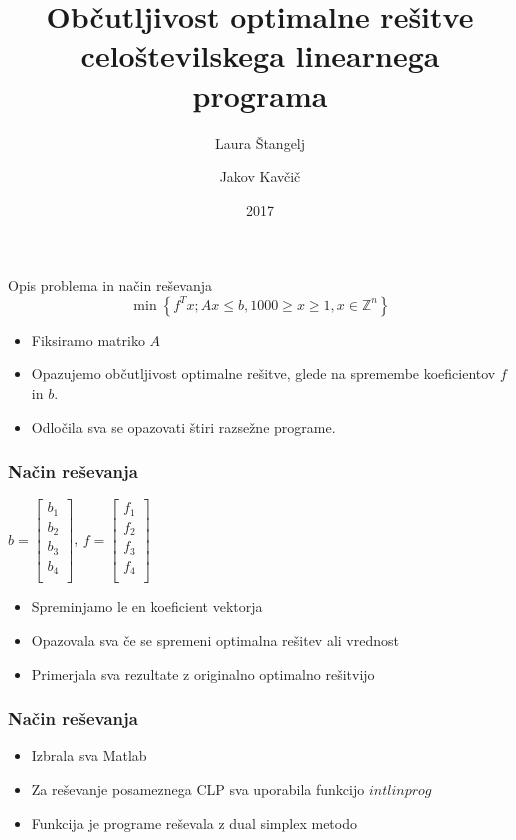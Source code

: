 \documentclass[t]{beamer}
\title{Občutljivost optimalne rešitve celoštevilskega linearnega programa}
\author
{Laura Štangelj \and Jakov Kavčič}
\date{2017}
\begin{document}
\begin{frame}
  \titlepage
\end{frame}

\begin{frame}{Opis problema in način reševanja}
$$\min\left\{f^Tx; Ax \leq b, 1000 \geq x \geq 1, x \in \mathbb{Z}^n \right\}$$
\begin{itemize}
\item Fiksiramo matriko $A$
\item Opazujemo občutljivost optimalne rešitve, glede na spremembe koeficientov $f$ in $b$.
\item Odločila sva se opazovati štiri razsežne programe.
\end{itemize}
\end{frame}

\begin{frame}
\frametitle{Način reševanja}
\begin{center}
$b = \begin{bmatrix}
b_1\\
b_2\\
b_3\\
b_4\\
\end{bmatrix}$, $f = \begin{bmatrix}
f_1\\
f_2\\
f_3\\
f_4\\
\end{bmatrix}$
\end{center}
\begin{itemize}
\item Spreminjamo le en koeficient vektorja
\item Opazovala sva če se spremeni optimalna rešitev ali vrednost
\item Primerjala sva rezultate z originalno optimalno rešitvijo
\end{itemize}
\end{frame}


\begin{frame}
\frametitle{Način reševanja}
\begin{itemize}
\item Izbrala sva Matlab
\item Za reševanje posameznega CLP sva uporabila funkcijo $intlinprog$
\item Funkcija je programe reševala z dual simplex metodo
\end{itemize}
\end{frame}
\end{document}
